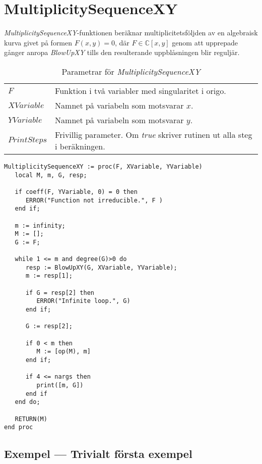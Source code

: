 \section{MultiplicitySequenceXY}
\label{MultiplicitySequenceXY}

\emph{MultiplicitySequenceXY}-funktionen beräknar multiplicitetsföljden av en algebraisk kurva givet på formen $F(x, y) = 0$, där $F \in \mathbb{C}\left[x, y\right]$ genom att upprepade gånger anropa \emph{BlowUpXY} tills den resulterande uppblåsningen blir reguljär.

\begin{table}[h]
\caption{Parametrar för \emph{MultiplicitySequenceXY}}
\begin{center}
\begin{tabular}{|l|p{9cm}|}
\hline
$F$ & Funktion i två variabler med singularitet i origo. \\
$XVariable$ & Namnet på variabeln som motsvarar $x$.\\
$YVariable$ & Namnet på variabeln som motsvarar $y$.\\
$PrintSteps$ & Frivillig parameter. Om \emph{true} skriver rutinen ut alla steg i beräkningen.\\
\hline
\end{tabular}
\end{center}
\end{table}

\begin{verbatim}
MultiplicitySequenceXY := proc(F, XVariable, YVariable)
   local M, m, G, resp;

   if coeff(F, YVariable, 0) = 0 then
      ERROR("Function not irreducible.", F )
   end if;

   m := infinity;
   M := [];
   G := F;

   while 1 <= m and degree(G)>0 do
      resp := BlowUpXY(G, XVariable, YVariable);
      m := resp[1];

      if G = resp[2] then 
         ERROR("Infinite loop.", G)
      end if;

      G := resp[2];

      if 0 < m then
         M := [op(M), m]
      end if;

      if 4 <= nargs then
         print([m, G])
      end if
   end do;

   RETURN(M)
end proc
\end{verbatim}

\subsection{Exempel --- Trivialt första exempel}
\label{MultiplicitySequenceXYEx1}

